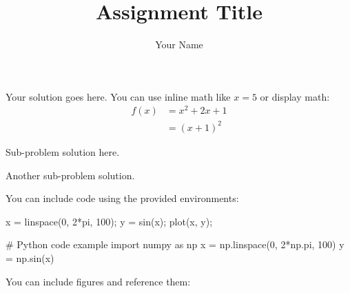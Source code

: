 \documentclass{homework}
\title{Assignment Title}
\author{Your Name}
\begin{document}
\makeheader


Your solution goes here. You can use inline math like $x = 5$ or display math:
\begin{align}
    f(x) &= x^2 + 2x + 1 \\
    &= (x + 1)^2
\end{align}


Sub-problem solution here.


Another sub-problem solution.


You can include code using the provided environments:

\begin{matlab}
x = linspace(0, 2*pi, 100);
y = sin(x);
plot(x, y);
\end{matlab}

\begin{python}
# Python code example
import numpy as np
x = np.linspace(0, 2*np.pi, 100)
y = np.sin(x)
\end{python}



You can include figures and reference them:

% 
\end{document}
